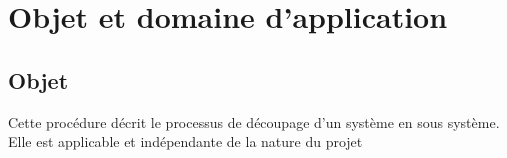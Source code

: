 \section{Objet et domaine d'application}
\subsection{Objet}
Cette procédure décrit le processus de découpage d'un système en sous système.
Elle est applicable et indépendante de la nature du projet 
